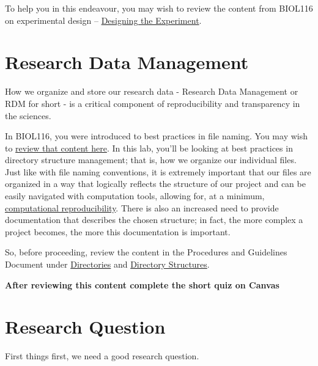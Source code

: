 \documentclass[
]{book}
\begin{document}
To help you in this endeavour, you may wish to review the content from BIOL116 on experimental design -- \href{https://ubco-biology.github.io/BIOL-116-Lab-Manual/designing-the-experiment.html}{Designing the Experiment}.

\hypertarget{research-data-management}{%
\chapter*{Research Data Management}\label{research-data-management}}

How we organize and store our research data - Research Data Management or RDM for short - is a critical component of reproducibility and transparency in the sciences.

In BIOL116, you were introduced to best practices in file naming. You may wish to \href{https://ubco-biology.github.io/Procedures-and-Guidelines/file-naming.html}{review that content here}. In this lab, you'll be looking at best practices in directory structure management; that is, how we organize our individual files. Just like with file naming conventions, it is extremely important that our files are organized in a way that logically reflects the structure of our project and can be easily navigated with computation tools, allowing for, at a minimum, \href{https://ubco-biology.github.io/BIOL-116-Lab-Manual/computational-reproducibility.html}{computational reproducibility}. There is also an increased need to provide documentation that describes the chosen structure; in fact, the more complex a project becomes, the more this documentation is important.

So, before proceeding, review the content in the Procedures and Guidelines Document under \href{https://ubco-biology.github.io/Procedures-and-Guidelines/directories.html}{Directories} and \href{https://ubco-biology.github.io/Procedures-and-Guidelines/directory-structures.html}{Directory Structures}.

\textbf{After reviewing this content complete the short quiz on Canvas}

\hypertarget{research-question}{%
\chapter*{Research Question}\label{research-question}}

First things first, we need a good research question.
\end{document}
